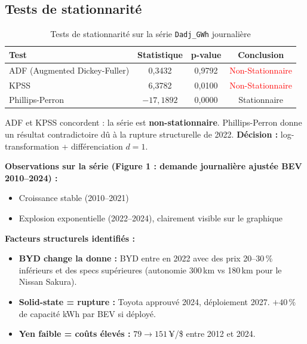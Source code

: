 \documentclass[12pt,a4paper]{article}
\begin{document}
\subsection{Tests de stationnarité}

\begin{table}[H]
\centering
\caption{Tests de stationnarité sur la série \texttt{Dadj\_GWh} journalière}
\begin{tabular}{lccc}
\toprule
\textbf{Test} & \textbf{Statistique} & \textbf{p-value} & \textbf{Conclusion} \\
\midrule
ADF (Augmented Dickey-Fuller)
  &  0,3432 & 0,9792 & \textcolor{red}{Non-Stationnaire} \\
KPSS
  &  6,3782 & 0,0100 & \textcolor{red}{Non-Stationnaire} \\
Phillips-Perron
  & $-17{,}1892$ & 0,0000 & \textcolor{successgreen}{Stationnaire} \\
\bottomrule
\end{tabular}
\end{table}

\begin{formulebox}
ADF et KPSS concordent : la série est \textbf{non-stationnaire}. Phillips-Perron donne un
résultat contradictoire dû à la rupture structurelle de 2022.
\textbf{Décision :} log-transformation + différenciation $d = 1$.
\end{formulebox}

\textbf{Observations sur la série (Figure 1 : demande journalière ajustée BEV 2010--2024) :}
\begin{itemize}
  \item Croissance stable (2010--2021)
  \item Explosion exponentielle (2022--2024), clairement visible sur le graphique
\end{itemize}

\textbf{Facteurs structurels identifiés :}
\begin{itemize}
  \item \textbf{BYD change la donne :} BYD entre en 2022 avec des prix 20--30\,\% inférieurs
        et des specs supérieures (autonomie 300\,km vs 180\,km pour le Nissan Sakura).
  \item \textbf{Solid-state = rupture :} Toyota approuvé 2024, déploiement 2027.
        $+40\,\%$ de capacité kWh par BEV si déployé.
  \item \textbf{Yen faible = coûts élevés :} $79 \to 151$\,¥/\$ entre 2012 et 2024.
\end{itemize}
\end{document}
